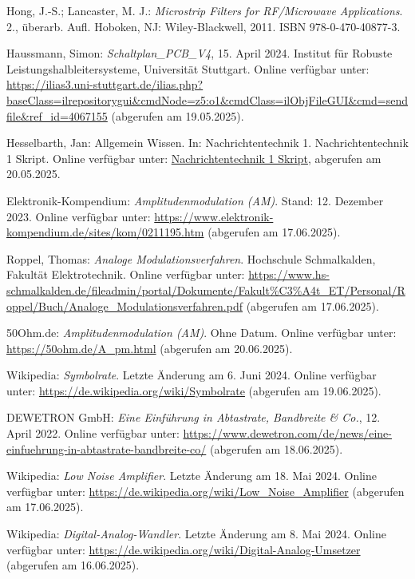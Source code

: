 \begin{thebibliography}{1}
Hong, J.-S.; Lancaster, M. J.: \emph{Microstrip Filters for RF/Microwave Applications}. 2., überarb. Aufl. Hoboken, NJ: Wiley-Blackwell, 2011. ISBN 978-0-470-40877-3.

Haussmann, Simon: \emph{Schaltplan\_PCB\_V4}, 15. April 2024. Institut für Robuste Leistungshalbleitersysteme, Universität Stuttgart. Online verfügbar unter: \url{https://ilias3.uni-stuttgart.de/ilias.php?baseClass=ilrepositorygui&cmdNode=z5:o1&cmdClass=ilObjFileGUI&cmd=sendfile&ref_id=4067155} (abgerufen am 19.05.2025).

Hesselbarth, Jan: Allgemein Wissen. In: Nachrichtentechnik 1. Nachrichtentechnik 1 Skript. Online verfügbar unter: \url{Nachrichtentechnik 1 Skript}, abgerufen am 20.05.2025.


Elektronik-Kompendium: \emph{Amplitudenmodulation (AM)}. Stand: 12. Dezember 2023.  
Online verfügbar unter: \url{https://www.elektronik-kompendium.de/sites/kom/0211195.htm} (abgerufen am 17.06.2025).

Roppel, Thomas: \emph{Analoge Modulationsverfahren}. Hochschule Schmalkalden, Fakultät Elektrotechnik.  
Online verfügbar unter: \url{https://www.hs-schmalkalden.de/fileadmin/portal/Dokumente/Fakult%C3%A4t_ET/Personal/Roppel/Buch/Analoge_Modulationsverfahren.pdf} (abgerufen am 17.06.2025).

50Ohm.de: \emph{Amplitudenmodulation (AM)}. Ohne Datum.  
Online verfügbar unter: \url{https://50ohm.de/A_pm.html} (abgerufen am 20.06.2025).

Wikipedia: \emph{Symbolrate}. Letzte Änderung am 6. Juni 2024.  
Online verfügbar unter: \url{https://de.wikipedia.org/wiki/Symbolrate} (abgerufen am 19.06.2025).

DEWETRON GmbH: \emph{Eine Einführung in Abtastrate, Bandbreite \& Co.}, 12. April 2022.  
Online verfügbar unter: \url{https://www.dewetron.com/de/news/eine-einfuehrung-in-abtastrate-bandbreite-co/} (abgerufen am 18.06.2025).

Wikipedia: \emph{Low Noise Amplifier}. Letzte Änderung am 18. Mai 2024.  
Online verfügbar unter: \url{https://de.wikipedia.org/wiki/Low_Noise_Amplifier} (abgerufen am 17.06.2025).

Wikipedia: \emph{Digital-Analog-Wandler}. Letzte Änderung am 8. Mai 2024.  
Online verfügbar unter: \url{https://de.wikipedia.org/wiki/Digital-Analog-Umsetzer} (abgerufen am 16.06.2025).


\end{thebibliography}
